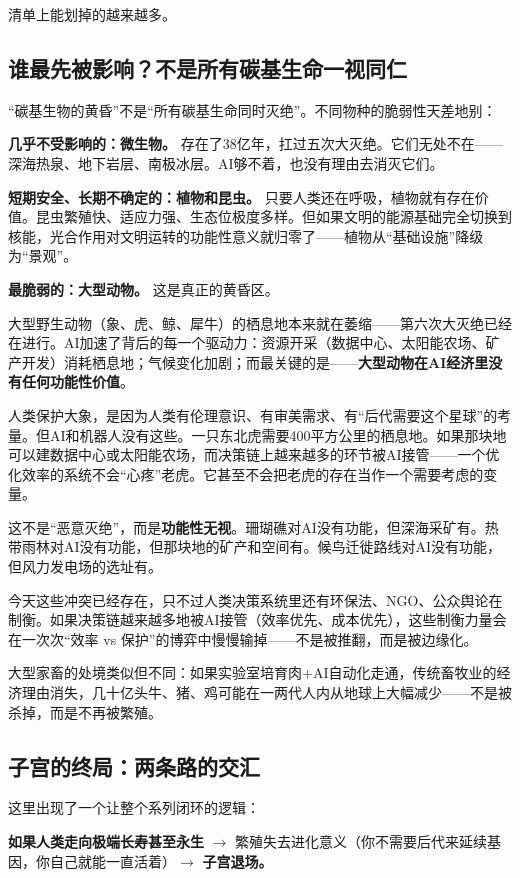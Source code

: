 \documentclass[11pt,a4paper]{ctexart}
\begin{document}
清单上能划掉的越来越多。

\subsection{谁最先被影响？不是所有碳基生命一视同仁}

“碳基生物的黄昏”不是“所有碳基生命同时灭绝”。不同物种的脆弱性天差地别：

\textbf{几乎不受影响的：微生物。} 存在了38亿年，扛过五次大灭绝。它们无处不在——深海热泉、地下岩层、南极冰层。AI够不着，也没有理由去消灭它们。

\textbf{短期安全、长期不确定的：植物和昆虫。} 只要人类还在呼吸，植物就有存在价值。昆虫繁殖快、适应力强、生态位极度多样。但如果文明的能源基础完全切换到核能，光合作用对文明运转的功能性意义就归零了——植物从“基础设施”降级为“景观”。

\textbf{最脆弱的：大型动物。} 这是真正的黄昏区。

大型野生动物（象、虎、鲸、犀牛）的栖息地本来就在萎缩——第六次大灭绝已经在进行。AI加速了背后的每一个驱动力：资源开采（数据中心、太阳能农场、矿产开发）消耗栖息地；气候变化加剧；而最关键的是——\textbf{大型动物在AI经济里没有任何功能性价值}。

人类保护大象，是因为人类有伦理意识、有审美需求、有“后代需要这个星球”的考量。但AI和机器人没有这些。一只东北虎需要400平方公里的栖息地。如果那块地可以建数据中心或太阳能农场，而决策链上越来越多的环节被AI接管——一个优化效率的系统不会“心疼”老虎。它甚至不会把老虎的存在当作一个需要考虑的变量。

这不是“恶意灭绝”，而是\textbf{功能性无视}。珊瑚礁对AI没有功能，但深海采矿有。热带雨林对AI没有功能，但那块地的矿产和空间有。候鸟迁徙路线对AI没有功能，但风力发电场的选址有。

今天这些冲突已经存在，只不过人类决策系统里还有环保法、NGO、公众舆论在制衡。如果决策链越来越多地被AI接管（效率优先、成本优先），这些制衡力量会在一次次“效率 vs 保护”的博弈中慢慢输掉——不是被推翻，而是被边缘化。

大型家畜的处境类似但不同：如果实验室培育肉+AI自动化走通，传统畜牧业的经济理由消失，几十亿头牛、猪、鸡可能在一两代人内从地球上大幅减少——不是被杀掉，而是不再被繁殖。

\subsection{子宫的终局：两条路的交汇}

这里出现了一个让整个系列闭环的逻辑：

\textbf{如果人类走向极端长寿甚至永生} $\to$ 繁殖失去进化意义（你不需要后代来延续基因，你自己就能一直活着）$\to$ \textbf{子宫退场。}
\end{document}
